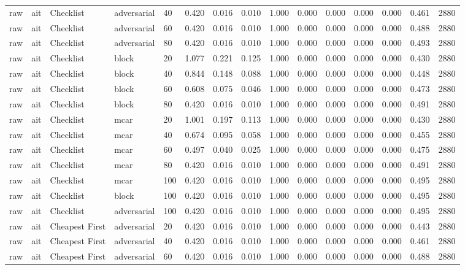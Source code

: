 \begin{table}[!ht]
{\begin{tabular}{lllllllllllllll}
raw & ait & Checklist & adversarial & 40 & 0.420 & 0.016 & 0.010 & 1.000 & 0.000 & 0.000 & 0.000 & 0.000 & 0.461 & 2880 \\
raw & ait & Checklist & adversarial & 60 & 0.420 & 0.016 & 0.010 & 1.000 & 0.000 & 0.000 & 0.000 & 0.000 & 0.488 & 2880 \\
raw & ait & Checklist & adversarial & 80 & 0.420 & 0.016 & 0.010 & 1.000 & 0.000 & 0.000 & 0.000 & 0.000 & 0.493 & 2880 \\
raw & ait & Checklist & block & 20 & 1.077 & 0.221 & 0.125 & 1.000 & 0.000 & 0.000 & 0.000 & 0.000 & 0.430 & 2880 \\
raw & ait & Checklist & block & 40 & 0.844 & 0.148 & 0.088 & 1.000 & 0.000 & 0.000 & 0.000 & 0.000 & 0.448 & 2880 \\
raw & ait & Checklist & block & 60 & 0.608 & 0.075 & 0.046 & 1.000 & 0.000 & 0.000 & 0.000 & 0.000 & 0.473 & 2880 \\
raw & ait & Checklist & block & 80 & 0.420 & 0.016 & 0.010 & 1.000 & 0.000 & 0.000 & 0.000 & 0.000 & 0.491 & 2880 \\
raw & ait & Checklist & mcar & 20 & 1.001 & 0.197 & 0.113 & 1.000 & 0.000 & 0.000 & 0.000 & 0.000 & 0.430 & 2880 \\
raw & ait & Checklist & mcar & 40 & 0.674 & 0.095 & 0.058 & 1.000 & 0.000 & 0.000 & 0.000 & 0.000 & 0.455 & 2880 \\
raw & ait & Checklist & mcar & 60 & 0.497 & 0.040 & 0.025 & 1.000 & 0.000 & 0.000 & 0.000 & 0.000 & 0.475 & 2880 \\
raw & ait & Checklist & mcar & 80 & 0.420 & 0.016 & 0.010 & 1.000 & 0.000 & 0.000 & 0.000 & 0.000 & 0.491 & 2880 \\
raw & ait & Checklist & mcar & 100 & 0.420 & 0.016 & 0.010 & 1.000 & 0.000 & 0.000 & 0.000 & 0.000 & 0.495 & 2880 \\
raw & ait & Checklist & block & 100 & 0.420 & 0.016 & 0.010 & 1.000 & 0.000 & 0.000 & 0.000 & 0.000 & 0.495 & 2880 \\
raw & ait & Checklist & adversarial & 100 & 0.420 & 0.016 & 0.010 & 1.000 & 0.000 & 0.000 & 0.000 & 0.000 & 0.495 & 2880 \\
raw & ait & Cheapest First & adversarial & 20 & 0.420 & 0.016 & 0.010 & 1.000 & 0.000 & 0.000 & 0.000 & 0.000 & 0.443 & 2880 \\
raw & ait & Cheapest First & adversarial & 40 & 0.420 & 0.016 & 0.010 & 1.000 & 0.000 & 0.000 & 0.000 & 0.000 & 0.461 & 2880 \\
raw & ait & Cheapest First & adversarial & 60 & 0.420 & 0.016 & 0.010 & 1.000 & 0.000 & 0.000 & 0.000 & 0.000 & 0.488 & 2880 \\

\end{tabular}}
\end{table}
